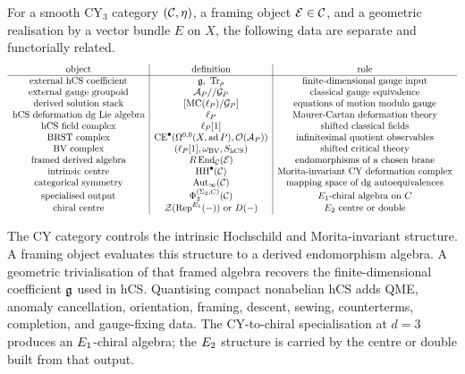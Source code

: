 For a smooth CY$_3$ category \((\mathcal{C},\eta)\), a framing object
\(\mathcal{E}\in\mathcal{C}\), and a geometric realisation by a vector bundle \(E\) on
\(X\), the following data are separate and functorially related.
\[
\begin{array}{c|c|c}
\text{object} & \text{definition} & \text{role}\\
\hline
\text{external hCS coefficient} & \mathfrak{g},\ \operatorname{Tr}_\rho & \text{finite-dimensional gauge input}\\
\text{external gauge groupoid} &
\mathcal{A}_P//\mathcal{G}_P &
\text{classical gauge equivalence}\\
\text{derived solution stack} &
[\operatorname{MC}(\ell_P)/\mathcal{G}_P] &
\text{equations of motion modulo gauge}\\
\text{hCS deformation dg Lie algebra} &
\ell_P &
\text{Maurer-Cartan deformation theory}\\
\text{hCS field complex} &
\ell_P[1] &
\text{shifted classical fields}\\
\text{BRST complex} &
\operatorname{CE}^\bullet(\Omega^{0,0}(X,\operatorname{ad}P),\mathcal{O}(\mathcal{A}_P)) &
\text{infinitesimal quotient observables}\\
\text{BV complex} &
(\ell_P[1],\omega_{\operatorname{BV}},S_{\mathrm{hCS}}) &
\text{shifted critical theory}\\
\text{framed derived algebra} &
R\operatorname{End}_{\mathcal{C}}(\mathcal{E}) &
\text{endomorphisms of a chosen brane}\\
\text{intrinsic centre} &
\operatorname{HH}^\bullet(\mathcal{C}) &
\text{Morita-invariant CY deformation complex}\\
\text{categorical symmetry} &
\mathrm{Aut}_{\infty}(\mathcal{C}) &
\text{mapping space of dg autoequivalences}\\
\text{specialised output} &
\Phi_3^{(\Sigma_2,C)}(\mathcal{C}) &
E_1\text{-chiral algebra on }C\\
\text{chiral centre} &
\mathcal{Z}(\operatorname{Rep}^{E_1}(-))\text{ or }D(-) &
E_2\text{ centre or double}
\end{array}
\]

The CY category controls the intrinsic Hochschild and Morita-invariant
structure. A framing object evaluates this structure to a derived
endomorphism algebra. A geometric trivialisation of that framed algebra
recovers the finite-dimensional coefficient \(\mathfrak{g}\) used in hCS.
Quantising compact nonabelian hCS adds QME, anomaly cancellation,
orientation, framing, descent, sewing, counterterms, completion, and
gauge-fixing data. The CY-to-chiral specialisation at \(d=3\) produces
an \(E_1\)-chiral algebra; the \(E_2\) structure is carried by the
centre or double built from that output.
